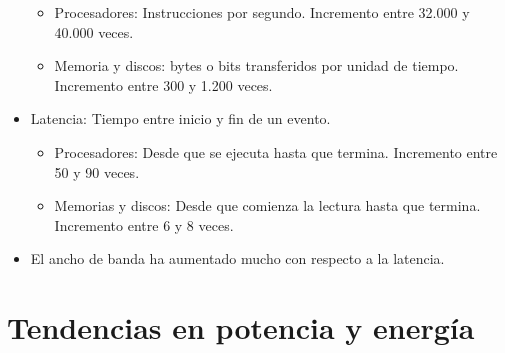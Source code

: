\documentclass[12pt, twoside, openright]{report} %
\begin{document}
\begin{itemize}
	      \begin{itemize}

		      \item Procesadores: Instrucciones por segundo. Incremento entre 32.000 y
		            40.000 veces.
		      \item Memoria y discos: bytes o bits transferidos por unidad de tiempo.
		            Incremento entre 300 y 1.200 veces.
	      \end{itemize}
	\item Latencia: Tiempo entre inicio y fin de un evento.

	      \begin{itemize}

		      \item Procesadores: Desde que se ejecuta hasta que termina. Incremento
		            entre 50 y 90 veces.
		      \item Memorias y discos: Desde que comienza la lectura hasta que
		            termina. Incremento entre 6 y 8 veces.
	      \end{itemize}
	\item El ancho de banda ha aumentado mucho con respecto a la latencia.

\end{itemize}
\section{Tendencias en potencia y energía}
\end{document}
